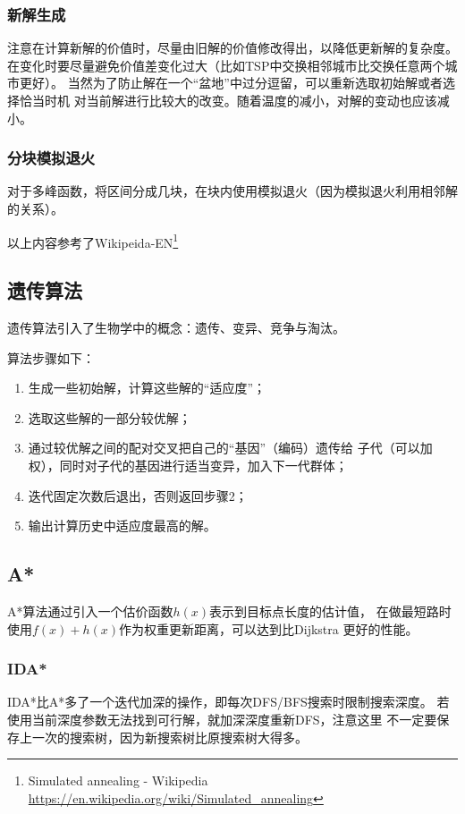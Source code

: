 \subsubsection{新解生成}
注意在计算新解的价值时，尽量由旧解的价值修改得出，以降低更新解的复杂度。
在变化时要尽量避免价值差变化过大（比如TSP中交换相邻城市比交换任意两个城市更好）。
当然为了防止解在一个``盆地''中过分逗留，可以重新选取初始解或者选择恰当时机
对当前解进行比较大的改变。随着温度的减小，对解的变动也应该减小。
\subsubsection{分块模拟退火}
对于多峰函数，将区间分成几块，在块内使用模拟退火（因为模拟退火利用相邻解的关系）。

以上内容参考了Wikipeida-EN\footnote{
	Simulated annealing - Wikipedia\\
	\url{https://en.wikipedia.org/wiki/Simulated\_annealing}
}
\subsection{遗传算法}
遗传算法引入了生物学中的概念：遗传、变异、竞争与淘汰。

算法步骤如下：
\begin{enumerate}
	\item 生成一些初始解，计算这些解的``适应度''；
	\item 选取这些解的一部分较优解；
	\item 通过较优解之间的配对交叉把自己的``基因''（编码）遗传给
	      子代（可以加权），同时对子代的基因进行适当变异，加入下一代群体；
	\item 迭代固定次数后退出，否则返回步骤2；
	\item 输出计算历史中适应度最高的解。
\end{enumerate}
\subsection{A*}
A*算法通过引入一个估价函数$h(x)$表示到目标点长度的估计值，
在做最短路时使用$f(x)+h(x)$作为权重更新距离，可以达到比Dijkstra
更好的性能。
\subsubsection{IDA*}
IDA*比A*多了一个迭代加深的操作，即每次DFS/BFS搜索时限制搜索深度。
若使用当前深度参数无法找到可行解，就加深深度重新DFS，注意这里
不一定要保存上一次的搜索树，因为新搜索树比原搜索树大得多。
